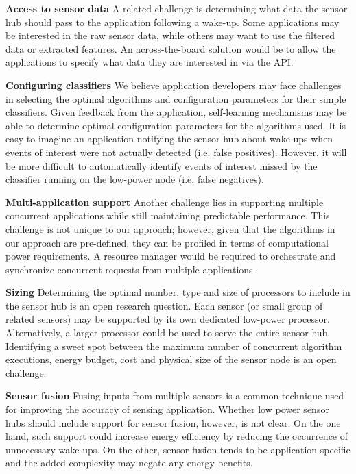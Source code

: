 {\bf Access to sensor data} A related challenge is determining what
data the sensor hub should pass to the application following a
wake-up. Some applications may be interested in the raw sensor data,
while others may want to use the filtered data or extracted features.
An across-the-board solution would be to allow the applications to
specify what data they are interested in via the API.

{\bf Configuring classifiers} We believe application developers may
face challenges in selecting the optimal algorithms and configuration
parameters for their simple classifiers. Given feedback from the
application, self-learning mechanisms may be able to determine optimal
configuration parameters for the algorithms used.  It is easy to 
imagine an application notifying the
sensor hub about wake-ups when events of interest were not actually
detected (i.e.  false positives).  However, it will be more difficult
to automatically identify events of interest missed by the classifier
running on the low-power node (i.e. false negatives).

{\bf Multi-application support} Another challenge lies in supporting
multiple concurrent applications while still maintaining predictable
performance.  This challenge is not unique to our approach; however,
given that the algorithms in our approach are pre-defined, they can be
profiled in terms of computational power requirements. A resource
manager would be required to orchestrate and synchronize concurrent
requests from multiple applications.

{\bf Sizing} Determining the optimal number, type and size of
processors to include in the sensor hub is an open research question.
Each sensor (or small group of related sensors) may be supported by
its own dedicated low-power processor. Alternatively, a larger
processor could be used to serve the entire sensor hub.  Identifying a
sweet spot between the maximum number of concurrent algorithm
executions, energy budget, cost and physical size of the sensor node
is an open challenge.

{\bf Sensor fusion} Fusing inputs from multiple sensors is a common
technique used for improving the accuracy of sensing application.
Whether low power sensor hubs should include support for sensor
fusion, however, is not clear.  On the one hand, such support could
increase energy efficiency by reducing the occurrence of unnecessary
wake-ups.  On the other, sensor fusion tends to be application specific
 and the added complexity may negate any energy benefits.


\vspace{10 mm}


